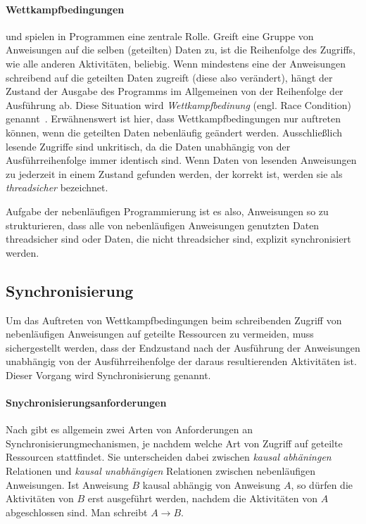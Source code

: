 \paragraph{Wettkampfbedingungen}
 und spielen in Programmen eine zentrale Rolle. Greift eine Gruppe von Anweisungen auf die selben (geteilten) Daten zu, ist die Reihenfolge des Zugriffs, wie alle anderen Aktivitäten, beliebig. Wenn mindestens eine der Anweisungen schreibend auf die geteilten Daten zugreift (diese also verändert), hängt der Zustand der Ausgabe des Programms im Allgemeinen von der Reihenfolge der Ausführung ab. Diese Situation wird \emph{Wettkampfbedinung} (engl. Race Condition) genannt~\cite{Hettel2016}. Erwähnenswert ist hier, dass Wettkampfbedingungen nur auftreten können, wenn die geteilten Daten nebenläufig geändert werden. Ausschließlich lesende Zugriffe sind unkritisch, da die Daten unabhängig von der Ausführreihenfolge immer identisch sind. Wenn Daten von lesenden Anweisungen zu jederzeit in einem Zustand gefunden werden, der korrekt ist, werden sie als \emph{threadsicher} bezeichnet. 

Aufgabe der nebenläufigen Programmierung ist es also, Anweisungen so zu strukturieren, dass alle von nebenläufigen Anweisungen genutzten Daten threadsicher sind oder Daten, die nicht threadsicher sind, explizit synchronisiert werden.

\subsection{Synchronisierung}
Um das Auftreten von Wettkampfbedingungen beim schreibenden Zugriff von nebenläufigen Anweisungen auf geteilte Ressourcen zu vermeiden, muss sichergestellt werden, dass der Endzustand nach der Ausführung der Anweisungen unabhängig von der Ausführreihenfolge der daraus resultierenden Aktivitäten ist. Dieser Vorgang wird Synchronisierung genannt.

\paragraph{Snychronisierungsanforderungen} Nach \textcite{Herrtwich1989} gibt es allgemein zwei Arten von Anforderungen an Synchronisierungmechanismen, je nachdem welche Art von Zugriff auf geteilte Ressourcen stattfindet. Sie unterscheiden dabei zwischen \emph{kausal abhäningen} Relationen und \emph{kausal unabhängigen} Relationen zwischen nebenläufigen Anweisungen. Ist Anweisung $B$ kausal abhängig von Anweisung $A$, so dürfen die Aktivitäten von $B$ erst ausgeführt werden, nachdem die Aktivitäten von $A$ abgeschlossen sind. Man schreibt $ A \to B$. 

